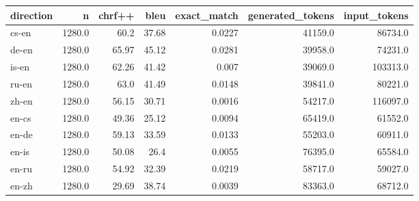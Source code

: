 \begin{tabular}{lrrrrrr}
\toprule
direction & n & chrf++ & bleu & exact_match & generated_tokens & input_tokens \\
\midrule
cs-en & 1280.0 & 60.2 & 37.68 & 0.0227 & 41159.0 & 86734.0 \\
de-en & 1280.0 & 65.97 & 45.12 & 0.0281 & 39958.0 & 74231.0 \\
is-en & 1280.0 & 62.26 & 41.42 & 0.007 & 39069.0 & 103313.0 \\
ru-en & 1280.0 & 63.0 & 41.49 & 0.0148 & 39841.0 & 80221.0 \\
zh-en & 1280.0 & 56.15 & 30.71 & 0.0016 & 54217.0 & 116097.0 \\
en-cs & 1280.0 & 49.36 & 25.12 & 0.0094 & 65419.0 & 61552.0 \\
en-de & 1280.0 & 59.13 & 33.59 & 0.0133 & 55203.0 & 60911.0 \\
en-is & 1280.0 & 50.08 & 26.4 & 0.0055 & 76395.0 & 65584.0 \\
en-ru & 1280.0 & 54.92 & 32.39 & 0.0219 & 58717.0 & 59027.0 \\
en-zh & 1280.0 & 29.69 & 38.74 & 0.0039 & 83363.0 & 68712.0 \\
\bottomrule
\end{tabular}
